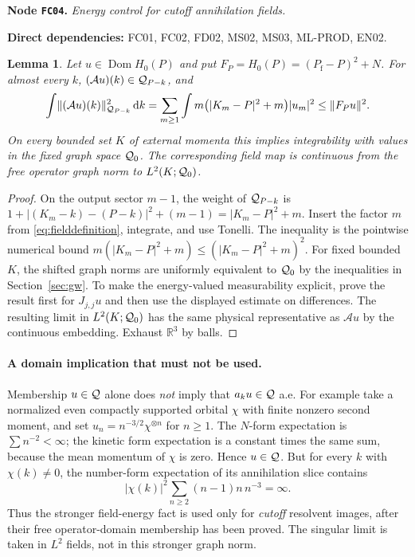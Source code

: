 \documentclass[11pt,a4paper]{article}
\newtheorem{lemma}[theorem]{Lemma}
\theoremstyle{remark}\newtheorem{remark}[theorem]{Remark}
\newcommand{\R}{\mathbb R}\newcommand{\C}{\mathbb C}\newcommand{\N}{\mathbb N}
\newcommand{\Pf}{P_{\mathrm f}}\newcommand{\Id}{I}\newcommand{\Dom}{\operatorname{Dom}}
\newcommand{\abs}[1]{\lvert #1\rvert}\newcommand{\rankone}[2]{\lvert #1\rangle\langle #2\rvert}
\newcommand{\dd}{\,\mathrm d}\newcommand{\almosteverywhere}{\text{a.e.}}
\newcommand{\node}[3]{\par\Needspace{6\baselineskip}\smallskip\hypertarget{node:#1}{}\label{nodepage:#1}\noindent\textbf{Node \texttt{#1}.} \textit{#2.}\par\noindent\textbf{Direct dependencies:} #3.\par}
\begin{document}
\node{FC04}{Energy control for cutoff annihilation fields}{FC01, FC02, FD02, MS02, MS03, ML-PROD, EN02}
\begin{lemma}\label{lem:fieldenergy}
Let $u\in\Dom H_0(P)$ and put $F_P=H_0(P)=(\Pf-P)^2+N$. For almost every $k$, $(\mathcal A u)(k)\in\mathcal Q_{P-k}$, and
\begin{equation}
 \int\norm{(\mathcal A u)(k)}_{\Q_{P-k}}^2\dd k
 =\sum_{m\geq1}\int m\bigl(\abs{K_m-P}^2+m\bigr)\abs{u_m}^2
 \leq\norm{F_Pu}^2.\label{eq:fieldenergyexact}
\end{equation}
On every bounded set $K$ of external momenta this implies integrability with values in the fixed graph space $\mathcal Q_0$. The corresponding field map is continuous from the free operator graph norm to $L^2(K;\mathcal Q_0)$.
\end{lemma}
\begin{proof}
On the output sector $m-1$, the weight of $\mathcal Q_{P-k}$ is
$1+\abs{(K_m-k)-(P-k)}^2+(m-1)=\abs{K_m-P}^2+m$.
Insert the factor $m$ from \eqref{eq:fielddefinition}, integrate, and use Tonelli. The inequality is the pointwise numerical bound
$m(\abs{K_m-P}^2+m)\leq(\abs{K_m-P}^2+m)^2$.
For fixed bounded $K$, the shifted graph norms are uniformly equivalent to $\mathcal Q_0$ by the inequalities in Section~\ref{sec:gw}. To make the energy-valued measurability explicit, prove the result first for $J_{j,j}u$ and then use the displayed estimate on differences. The resulting limit in $L^2(K;\mathcal Q_0)$ has the same physical representative as $\mathcal A u$ by the continuous embedding. Exhaust $\R^3$ by balls.
\end{proof}
\paragraph{A domain implication that must not be used.}
Membership $u\in\mathcal Q$ alone does \emph{not} imply that $a_ku\in\mathcal Q$ a.e. For example take a normalized even compactly supported orbital $\chi$ with finite nonzero second moment, and set
$u_n=n^{-3/2}\chi^{\otimes n}$ for $n\geq1$.
The $N$-form expectation is $\sum n^{-2}<\infty$; the kinetic form expectation is a constant times the same sum, because the mean momentum of $\chi$ is zero. Hence $u\in\mathcal Q$. But for every $k$ with $\chi(k)\ne0$, the number-form expectation of its annihilation slice contains
\[
 \abs{\chi(k)}^2\sum_{n\geq2}(n-1)n\,n^{-3}=\infty.
\]
Thus the stronger field-energy fact is used only for \emph{cutoff} resolvent images, after their free operator-domain membership has been proved. The singular limit is taken in $L^2$ fields, not in this stronger graph norm.
\end{document}
